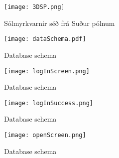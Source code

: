 \documentclass[12pt, git, final]{rureport}
\begin{document}
\begin{figure}
	\centering
	\texttt{[image: 3DSP.png]}
	\caption{Sólmyrkvarnir séð frá Suður pólnum}
	\label{fig:3DSP}
\end{figure}

\begin{figure}
	\centering 
	\texttt{[image: dataSchema.pdf]}
	\caption{Database schema \label{fig:dataschema}}
\end{figure} 
%
\begin{figure}
	\centering 
	\texttt{[image: logInScreen.png]}
	\caption{Database schema \label{fig:logScreen}}
\end{figure} 

\begin{figure}
	\centering 
	\texttt{[image: logInSuccess.png]}
	\caption{Database schema \label{fig:logsucces}}
\end{figure} 

\begin{figure}[t]
	\centering 
	\texttt{[image: openScreen.png]}
	\caption{Database schema \label{fig:openScreen}}
\end{figure} 

\clearpage

\printbibliography
\end{document}
